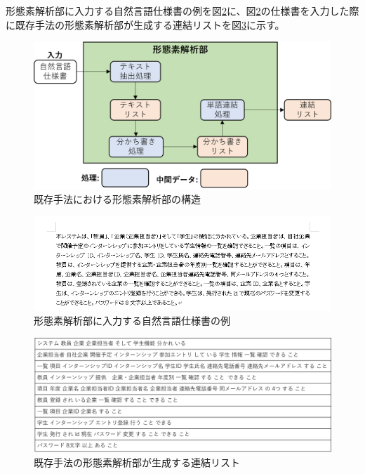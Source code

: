 形態素解析部に入力する自然言語仕様書の例を図\ref{fig:exis_spec_example}に、図\ref{fig:exis_spec_example}の仕様書を入力した際に既存手法の形態素解析部が生成する連結リストを図\ref{fig:exis_connect_list}に示す。

\begin{figure}[tp]
    \begin{center}
        \includegraphics[width=1.0\columnwidth]{image/exis_mor_structure.png}
        \caption{既存手法における形態素解析部の構造}
        \label{fig:exis_mor_structure}
    \end{center}
\end{figure}

\begin{figure}[tp]
    \begin{center}
        \includegraphics[width=1.0\columnwidth]{image/exis_spec_example.png}
        \caption{形態素解析部に入力する自然言語仕様書の例}
        \label{fig:exis_spec_example}
    \end{center}
\end{figure}

\begin{figure}[tp]
    \begin{center}
        \includegraphics[width=1.0\columnwidth]{image/exis_connect_list.png}
        \caption{既存手法の形態素解析部が生成する連結リスト}
        \label{fig:exis_connect_list}
    \end{center}
\end{figure}

